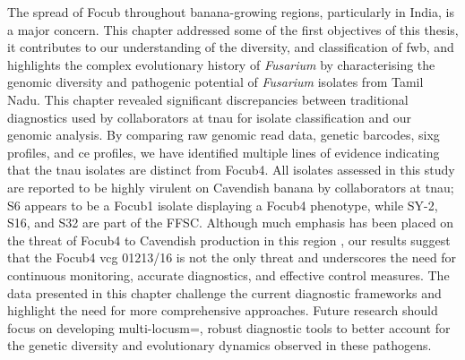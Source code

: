 The spread of \ac{Focub} throughout banana-growing regions, particularly in India, is a major concern. This chapter addressed some of the first objectives of this thesis, it contributes to our understanding of the diversity, and classification of \ac{fwb}, and highlights the complex evolutionary history of \textit{Fusarium} by characterising the genomic diversity and pathogenic potential of \textit{Fusarium} isolates from Tamil Nadu. This chapter revealed significant discrepancies between traditional diagnostics used by collaborators at \ac{tnau} for isolate classification and our genomic analysis. By comparing raw genomic read data, genetic barcodes, \ac{sixg} profiles, and \acl{ce} profiles, we have identified multiple lines of evidence indicating that the \ac{tnau} isolates are distinct from \ac{Focub4}. All isolates assessed in this study are reported to be highly virulent on Cavendish banana by collaborators at \ac{tnau}; S6 appears to be a \ac{Focub1} isolate displaying a \ac{Focub4} phenotype, while SY-2, S16, and S32 are part of the \ac{FFSC}. Although much emphasis has been placed on the threat of \ac{Focub4} to Cavendish production in this region \parencite{Viljoen2020, Damodaran2019}, our results suggest that the \ac{Focub4} \ac{vcg} 01213/16 is not the only threat and underscores the need for continuous monitoring, accurate diagnostics, and effective control measures. The data presented in this chapter challenge the current diagnostic frameworks and highlight the need for more comprehensive approaches. Future research should focus on developing multi-locusm=, robust diagnostic tools to better account for the genetic diversity and evolutionary dynamics observed in these pathogens.